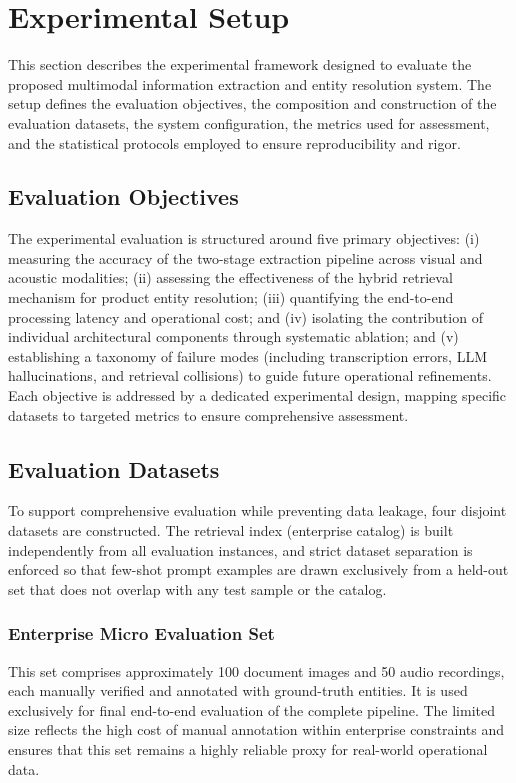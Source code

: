 \section{Experimental Setup}
This section describes the experimental framework designed to evaluate the proposed multimodal information extraction and entity resolution system. The setup defines the evaluation objectives, the composition and construction of the evaluation datasets, the system configuration, the metrics used for assessment, and the statistical protocols employed to ensure reproducibility and rigor.

\subsection{Evaluation Objectives}
The experimental evaluation is structured around five primary objectives:
(i) measuring the accuracy of the two-stage extraction pipeline across visual and acoustic modalities;
(ii) assessing the effectiveness of the hybrid retrieval mechanism for product entity resolution;
(iii) quantifying the end-to-end processing latency and operational cost; and
(iv) isolating the contribution of individual architectural components through systematic ablation; and
(v) establishing a taxonomy of failure modes (including transcription errors, LLM hallucinations, and retrieval collisions) to guide future operational refinements.
Each objective is addressed by a dedicated experimental design, mapping specific datasets to targeted metrics to ensure comprehensive assessment.


\subsection{Evaluation Datasets}
To support comprehensive evaluation while preventing data leakage, four disjoint datasets are constructed. The retrieval index (enterprise catalog) is built independently from all evaluation instances, and strict dataset separation is enforced so that few-shot prompt examples are drawn exclusively from a held-out set that does not overlap with any test sample or the catalog.

\subsubsection{Enterprise Micro Evaluation Set}
This set comprises approximately 100 document images and 50 audio recordings, each manually verified and annotated with ground-truth entities. It is used exclusively for final end-to-end evaluation of the complete pipeline. The limited size reflects the high cost of manual annotation within enterprise constraints and ensures that this set remains a highly reliable proxy for real-world operational data.

